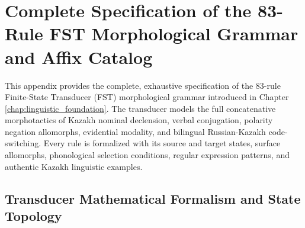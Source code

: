 \chapter{Complete Specification of the 83-Rule FST Morphological Grammar and Affix Catalog}
\label{app:fst_grammar}

This appendix provides the complete, exhaustive specification of the 83-rule Finite-State Transducer (FST) morphological grammar introduced in Chapter \ref{chap:linguistic_foundation}. The transducer models the full concatenative morphotactics of Kazakh nominal declension, verbal conjugation, polarity negation allomorphs, evidential modality, and bilingual Russian-Kazakh code-switching. Every rule is formalized with its source and target states, surface allomorphs, phonological selection conditions, regular expression patterns, and authentic Kazakh linguistic examples.

\section{Transducer Mathematical Formalism and State Topology}
\label{sec:app_fst_formalism}

